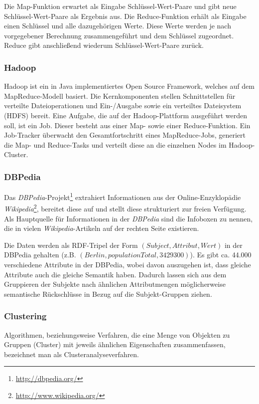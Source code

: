 \documentclass[a4paper]{llncs}
\begin{document}
Die Map-Funktion erwartet als Eingabe Schlüssel-Wert-Paare und gibt neue Schlüssel-Wert-Paare als Ergebnis aus.
Die Reduce-Funktion erhält als Eingabe einen Schlüssel und alle dazugehörigen Werte.
Diese Werte werden je nach vorgegebener Berechnung zusammengeführt und dem Schlüssel zugeordnet.
Reduce gibt anschließend wiederum Schlüssel-Wert-Paare zurück.

\subsubsection{Hadoop}
Hadoop ist ein in Java implementiertes Open Source Framework, welches auf dem MapReduce-Modell basiert.
Die Kernkomponenten stellen Schnittstellen für verteilte Dateioperationen und Ein-/Ausgabe sowie ein verteiltes Dateisystem (HDFS) bereit.
Eine Aufgabe, die auf der Hadoop-Plattform ausgeführt werden soll, ist ein Job.
Dieser besteht aus einer Map- sowie einer Reduce-Funktion.
Ein Job-Tracker überwacht den Gesamtfortschritt eines MapReduce-Jobs,
generiert die Map- und Reduce-Tasks und verteilt diese an die einzelnen Nodes im Hadoop-Cluster.

\subsubsection{DBPedia}
Das \emph{DBPedia}-Projekt\footnote{\url{http://dbpedia.org/}} extrahiert Informationen aus der Online-Enzyklopädie \emph{Wikipedia}\footnote{\url{http://www.wikipedia.org/}}, bereitet diese auf und stellt diese strukturiert zur freien Verfügung.
Als Hauptquelle für Informationen in der \emph{DBPedia} sind die Infoboxen zu nennen, die in vielen \emph{Wikipedia}-Artikeln auf der rechten Seite existieren.

Die Daten werden als RDF-Tripel der Form $(Subject, Attribut, Wert)$ in der DBPedia gehalten (z.B. $(Berlin, populationTotal, 3429300)$).
Es gibt ca. 44.000 verschiedene Attribute in der DBPedia, wobei davon auszugehen ist, dass gleiche Attribute auch die gleiche Semantik haben. Dadurch lassen sich aus dem Gruppieren der Subjekte nach ähnlichen Attributmengen möglicherweise semantische Rückschlüsse in Bezug auf die Subjekt-Gruppen ziehen.

\subsubsection{Clustering}
Algorithmen, beziehungsweise Verfahren, die eine Menge von Objekten zu Gruppen (Cluster) mit jeweils ähnlichen Eigenschaften zusammenfassen, bezeichnet man als Clusteranalyseverfahren.
\end{document}
